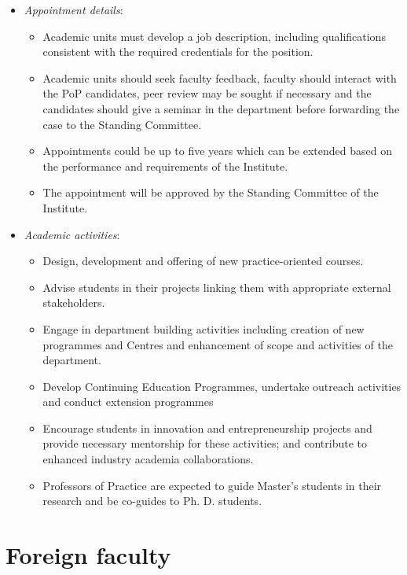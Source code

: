 \documentclass[
  10pt,
  a5paper,
  10pt,
  openany]{amsbook}
\providecommand{\tightlist}{%
  \setlength{\itemsep}{0pt}\setlength{\parskip}{0pt}}
\begin{document}
\begin{itemize}
\tightlist
\item
  \emph{Appointment details}:

  \begin{itemize}
  \tightlist
  \item
    Academic units must develop a job description, including
    qualifications consistent with the required credentials for the
    position.
  \item
    Academic units should seek faculty feedback, faculty should interact
    with the PoP candidates, peer review may be sought if necessary and
    the candidates should give a seminar in the department before
    forwarding the case to the Standing Committee.
  \item
    Appointments could be up to five years which can be extended based
    on the performance and requirements of the Institute.
  \item
    The appointment will be approved by the Standing Committee of the
    Institute.
  \end{itemize}
\item
  \emph{Academic activities}:

  \begin{itemize}
  \tightlist
  \item
    Design, development and offering of new practice-oriented courses.
  \item
    Advise students in their projects linking them with appropriate
    external stakeholders.
  \item
    Engage in department building activities including creation of new
    programmes and Centres and enhancement of scope and activities of
    the department.
  \item
    Develop Continuing Education Programmes, undertake outreach
    activities and conduct extension programmes
  \item
    Encourage students in innovation and entrepreneurship projects and
    provide necessary mentorship for these activities; and contribute to
    enhanced industry academia collaborations.
  \item
    Professors of Practice are expected to guide Master's students in
    their research and be co-guides to Ph. D. students.
  \end{itemize}
\end{itemize}

\section{Foreign faculty}\label{foreign-faculty}
\end{document}
